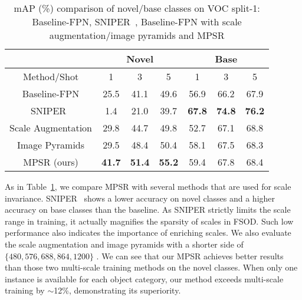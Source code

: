 \documentclass[runningheads]{llncs}
\begin{document}
\setlength{\tabcolsep}{5pt}
\begin{table}
	\begin{center}
		\caption{mAP (\%) comparison of novel/base classes on VOC split-1: Baseline-FPN, SNIPER~\cite{sniper},  Baseline-FPN with scale augmentation/image pyramids and MPSR}
		\label{table:iptable}
		\begin{tabular}{c|ccc|ccc}
			\hline
			\multicolumn{1}{c|}{} & \multicolumn{3}{c|}{Novel}                    & \multicolumn{3}{c}{Base}                      \\ \hline
			Method/Shot           & 1             & 3             & 5             & 1             & 3             & 5             \\ \hline
			Baseline-FPN          & 25.5          & 41.1          & 49.6          & 56.9          & 66.2          & 67.9          \\
			SNIPER~\cite{sniper} & 1.4          & 21.0          & 39.7          & \textbf{67.8}          & \textbf{74.8}          & \textbf{76.2}          \\
			Scale Augmentation        & 29.8          & 44.7          & 49.8          & 52.7          & 67.1          & 68.8          \\
			Image Pyramids        & 29.5          & 48.4          & 50.4          & 58.1          & 67.5          & 68.3          \\
			MPSR (ours)           & \textbf{41.7} & \textbf{51.4} & \textbf{55.2} & 59.4 & 67.8 & 68.4 \\ \hline
		\end{tabular}
	\end{center}
\end{table}
\setlength{\tabcolsep}{1.4pt}

As in Table~\ref{table:iptable}, we compare MPSR with several methods that are used for scale invariance.
SNIPER~\cite{sniper} shows a lower accuracy on novel classes and a higher accuracy on base classes than the baseline. 
As SNIPER strictly limits the scale range in training, it actually magnifies the sparsity of scales in FSOD. 
Such low performance also indicates the importance of enriching scales.  
We also evaluate the scale augmentation and image pyramids with a shorter side of $\{480,576,688,864,1200\}$ \cite{sppnet}.
We can see that our MPSR achieves better results than those two  multi-scale training methods on the novel classes. 
When only one instance is available for each object category, our method exceeds multi-scale training by $\sim$12\%, demonstrating its superiority.
\end{document}
